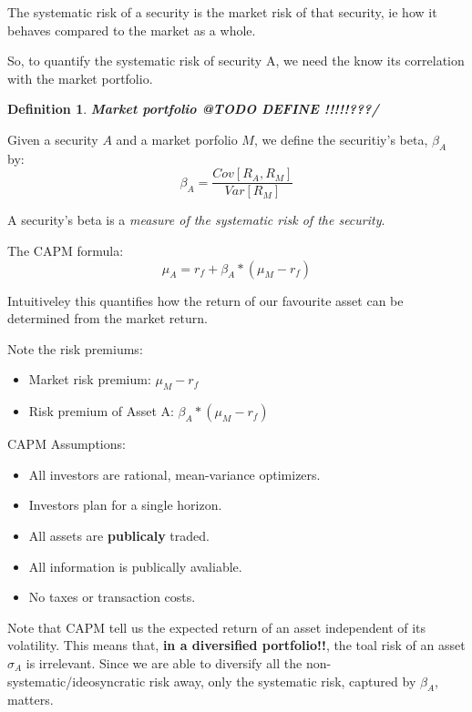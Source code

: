 \documentclass{article}
\newtheorem{definition}{Definition}
\begin{document}
The systematic risk of a security is the market risk of that security, ie how it behaves compared to the market as a whole. 

So, to quantify the systematic risk of security A, we need the know its correlation with the market portfolio. 

\begin{definition}
\textbf{Market portfolio @TODO DEFINE !!!!!???/}
\end{definition}

Given a security $A$ and a market porfolio $M$, we define the securitiy's beta, $\beta_A$ by:
\[ \beta_A = \frac{Cov[R_A, R_M]}{Var[R_M]}\]

A security's beta is a \textit{measure of the systematic risk of the security}. 

The CAPM formula:
\[ \mu_A = r_f + \beta_A *(\mu_M - r_f) \]

Intuitiveley this quantifies how the return of our favourite asset can be determined from the market return. 

Note the risk premiums: 
\begin{itemize}
\item Market risk premium: $\mu_M - r_f$ 
\item Risk premium of Asset A: $\beta_A *(\mu_M - r_f)$
\end{itemize}

CAPM Assumptions: 
\begin{itemize}
\item All investors are rational, mean-variance optimizers. 
\item Investors plan for a single horizon.
\item All assets are \textbf{publicaly} traded.
\item All information is publically avaliable. 
\item No taxes or transaction costs.  
\end{itemize}

Note that CAPM tell us the expected return of an asset independent of its volatility. This means that, \textbf{in a diversified portfolio!!}, the toal risk of an asset $\sigma_A$ is irrelevant. Since we are able to diversify all the non-systematic/ideosyncratic risk away, only the systematic risk, captured by $\beta_A$, matters. 
\end{document}
